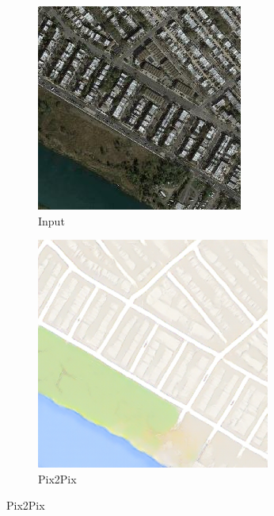 \begin{figure}
	\begin{subfigure}[t]{.2\textwidth}
	  \caption*{Input}
	  \centering
	  \includegraphics[width=\linewidth]{images/cycleGanResults/Satelite6_Or_Ld120_E100_Lr0002.jpg}
	\end{subfigure}
	\begin{subfigure}[t]{.2\textwidth}
	  \caption*{Pix2Pix}
	  \centering
	  \includegraphics[width=\linewidth]{images/Vergleich/p3.png}

\end{subfigure}
\end{figure}

